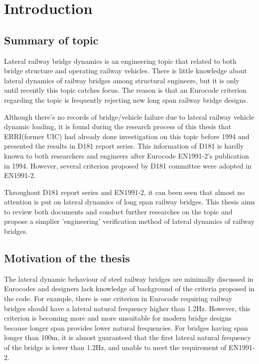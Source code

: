 

\chapter{Introduction}

\section{Summary of topic}


Lateral railway bridge dynamics is an engineering topic that related to both bridge structure and operating railway vehicles. There is little knowledge about lateral dynamics of railway bridges among structural engineers, but it is only until recently this topic catches focus. The reason is that an Eurocode criterion regarding the topic is frequently rejecting new long span railway bridge designs. 

Although there's no records of bridge/vehicle failure due to lateral railway vehicle dynamic loading, it is found during the research process of this thesis that ERRI(former UIC) had already done investigation on this topic before 1994 and presented the results in D181 report series. This information of D181 is hardly known to both researchers and engineers after Eurocode EN1991-2's publication in 1994. However, several criterion proposed by D181 committee were adopted in EN1991-2.

Throughout D181 report series and EN1991-2, it can been seen that almost no attention is put on lateral dynamics of long span railway bridges. This thesis aims to review both documents and conduct further researches on the topic and propose a simplier 'engineering' verification method of lateral dynamics of railway bridges.

\section{Motivation of the thesis}

The lateral dynamic behaviour of steel railway bridges are minimally discussed in Eurocodes and designers lack knowledge of background of the criteria proposed in the code. For example, there is one criterion in Eurocode requiring railway bridges should have a lateral natural frequency higher than 1.2Hz. However, this criterion is becoming more and more unsuitable for modern bridge designs because longer span provides lower natural frequencies. For bridges having span longer than 100m, it is almost guaranteed that the first lateral natural frequency of the bridge is lower than 1.2Hz, and unable to meet the requirement of EN1991-2. 

